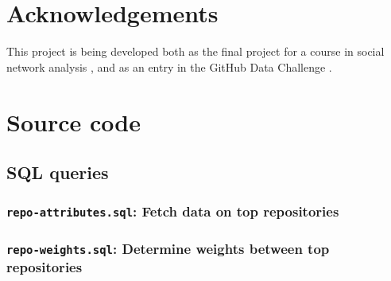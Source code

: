 \documentclass[twocolumn]{article}
\begin{document}
\section{Acknowledgements}
This project is being developed both as the final project for a course in social
network analysis \cite{snacourse}, and as an entry in the GitHub Data Challenge
\cite{doll13}.




\onecolumn
\appendix
\section{Source code}
\label{app:code}
\subsection{SQL queries}

\subsubsection{\texttt{repo-attributes.sql}: Fetch data on top
repositories}


\subsubsection{\texttt{repo-weights.sql}: Determine weights between top
repositories}

\end{document}
